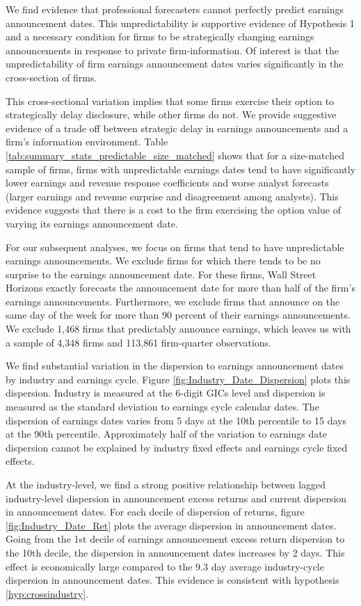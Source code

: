 \documentclass[ecta,nameyear,draft]{econsocart}
\theoremstyle{theorem}
\numberwithin{lemma}{section}
\numberwithin{proposition}{section}
\numberwithin{equation}{section}
\numberwithin{figure}{section}
\begin{document}
We find evidence that professional forecasters cannot perfectly predict earnings announcement dates. This unpredictability is supportive evidence of Hypothesis 1 and a necessary condition for firms to be strategically changing earnings announcements in response to private firm-information. Of interest is that the unpredictability of firm earnings announcement dates varies significantly in the cross-section of firms. 

This cross-sectional variation implies that some firms exercise their option to strategically delay disclosure, while other firms do not. We provide suggestive evidence of a trade off between strategic delay in earnings announcements and a firm's information environment. Table \ref{tab:summary_stats_predictable_size_matched} shows that for a size-matched sample of firms, firms with unpredictable earnings dates tend to have significantly lower earnings and revenue response coefficients and worse analyst forecasts (larger earnings and revenue surprise and disagreement among analysts). This evidence suggests that there is a cost to the firm exercising the option value of varying its earnings announcement date. 

For our subsequent analyses, we focus on firms that tend to have unpredictable earnings announcements. We exclude firms for which there tends to be no surprise to the earnings announcement date. For these firms, Wall Street Horizons exactly forecasts the announcement date for more than half of the firm's earnings announcements. Furthermore, we exclude firms that announce on the same day of the week for more than 90 percent of their earnings announcements. We exclude 1,468 firms that predictably announce earnings, which leaves us with a sample of 4,348 firms and 113,861 firm-quarter observations. 

We find substantial variation in the dispersion to earnings announcement dates by industry and earnings cycle. Figure \ref{fig:Industry_Date_Dispersion} plots this dispersion. Industry is measured at the 6-digit GICs level and dispersion is measured as the standard deviation to earnings cycle calendar dates. The dispersion of earnings dates varies from 5 days at the 10th percentile to 15 days at the 90th percentile. Approximately half of the variation to earnings date dispersion cannot be explained by industry fixed effects and earnings cycle fixed effects.

At the industry-level, we find a strong positive relationship between lagged industry-level dispersion in announcement excess returns and current dispersion in announcement dates. For each decile of dispersion of returns, figure \ref{fig:Industry_Date_Ret} plots the average dispersion in announcement dates. Going from the 1st decile of earnings announcement excess return dispersion to the 10th decile, the dispersion in announcement dates increases by 2 days. This effect is economically large compared to the 9.3 day average industry-cycle dispersion in announcement dates. This evidence is consistent with hypothesis \ref{hyp:crossindustry}. 
\end{document}
